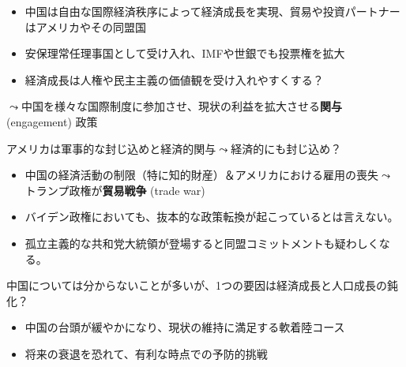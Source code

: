 \documentclass[
  xelatex,
  ja=standard]{bxjsarticle}
\providecommand{\tightlist}{%
  \setlength{\itemsep}{0pt}\setlength{\parskip}{0pt}}\usepackage{longtable,booktabs,array}
\begin{document}
\begin{itemize}
\tightlist
\item
  中国は自由な国際経済秩序によって経済成長を実現、貿易や投資パートナーはアメリカやその同盟国
\item
  安保理常任理事国として受け入れ、IMFや世銀でも投票権を拡大
\item
  経済成長は人権や民主主義の価値観を受け入れやすくする？
\end{itemize}

\(\leadsto\)中国を様々な国際制度に参加させ、現状の利益を拡大させる\textbf{関与}
(engagement) 政策

アメリカは軍事的な封じ込めと経済的関与\(\leadsto\)経済的にも封じ込め？

\begin{itemize}
\tightlist
\item
  中国の経済活動の制限（特に知的財産）＆アメリカにおける雇用の喪失\(\leadsto\)トランプ政権が\textbf{貿易戦争}
  (trade war)
\item
  バイデン政権においても、抜本的な政策転換が起こっているとは言えない。
\item
  孤立主義的な共和党大統領が登場すると同盟コミットメントも疑わしくなる。
\end{itemize}

中国については分からないことが多いが、1つの要因は経済成長と人口成長の鈍化？

\begin{itemize}
\tightlist
\item
  中国の台頭が緩やかになり、現状の維持に満足する軟着陸コース
\item
  将来の衰退を恐れて、有利な時点での予防的挑戦
\end{itemize}


  
\end{document}
